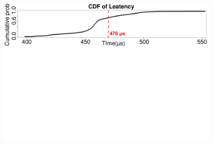 \begin{figure}[t]
  \centering
    \includegraphics[trim={0 16cm 0 0}, clip, width=\linewidth]{data/graph/CDF_Latency_new.pdf}
    \caption{\cumulativeCaption}
    \vspace{-10px}
    \label{fig:cdf}
\end{figure}

\else

